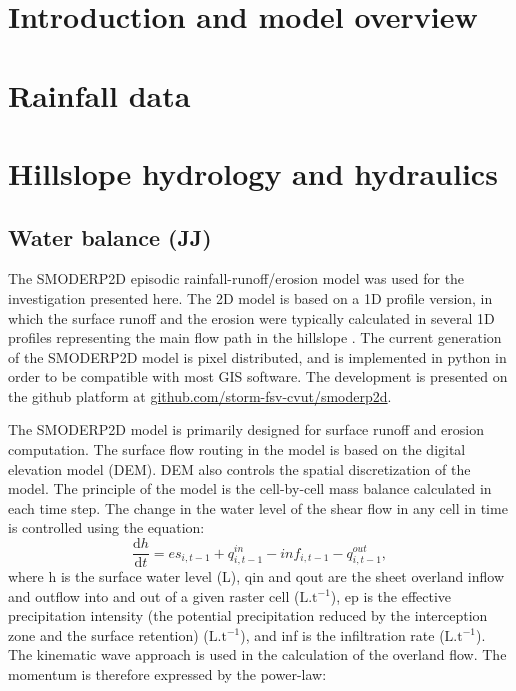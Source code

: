 

\section{Introduction and model overview}



\section{Rainfall data}

\section{Hillslope hydrology and hydraulics}

    \subsection{Water balance (JJ)}

    The SMODERP2D episodic rainfall-runoff/erosion model was used for the
    investigation presented here. The 2D model is based on a 1D profile version, in
    which the surface runoff and the erosion were typically calculated in several
    1D profiles representing the main flow path in the hillslope \cite{Dostal2000}.
    The current generation of the SMODERP2D model is pixel distributed, and is
    implemented in python in order to be compatible with most GIS software. The
    development is presented on the github platform at
    \href{https://github.com/storm-fsv-cvut/smoderp2d}{github.com/storm-fsv-cvut/smoderp2d}.

    The SMODERP2D model is primarily designed for surface runoff and erosion
    computation. The surface flow routing in the model is based on the digital
    elevation model (DEM). DEM also controls the spatial discretization of the
    model. The principle of the model is the cell-by-cell mass balance calculated
    in each time step. The change in the water level of the shear flow in any cell
    in time is controlled using the equation: 
    \begin{equation} 
    \frac{\mathrm{d}h}{\mathrm{d}t} = es_{i,t-1} + q^{in}_{i,t-1} - inf_{i,t-1} - q^{out}_{i,t-1},
    \label{eq:bilance}
    \end{equation}
    where h is the surface water level (L), qin and qout are the sheet overland
    inflow and outflow into and out of a given raster cell ($\mathrm{L.t^{-1}}$),
    ep is the effective precipitation intensity (the potential precipitation
    reduced by the interception zone and the surface retention)
    ($\mathrm{L.t^{-1}}$), and inf is the infiltration rate ($\mathrm{L.t^{-1}}$).
    The kinematic wave approach is used in the calculation of the overland flow.
    The momentum is therefore expressed by the power-law:

